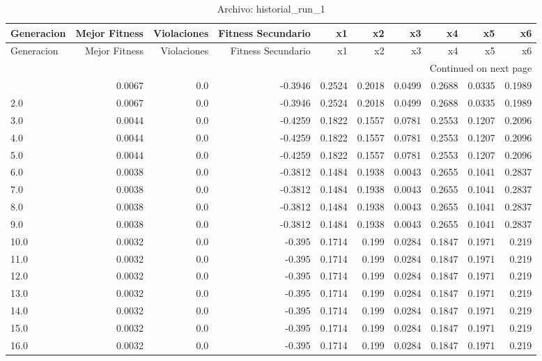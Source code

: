 \begin{longtable}{lrrrrrrrrr}
\caption{Archivo: historial\_run\_1}\label{tab:historial_run_1} \\
\toprule
Generacion & Mejor Fitness & Violaciones & Fitness Secundario & x1 & x2 & x3 & x4 & x5 & x6 \\
\midrule
\endfirsthead
\toprule
Generacion & Mejor Fitness & Violaciones & Fitness Secundario & x1 & x2 & x3 & x4 & x5 & x6 \\
\midrule
\endhead
\midrule
\multicolumn{10}{r}{Continued on next page} \\
\midrule
\endfoot
\bottomrule
\endlastfoot
1.0 & 0.0067 & 0.0 & -0.3946 & 0.2524 & 0.2018 & 0.0499 & 0.2688 & 0.0335 & 0.1989 \\
2.0 & 0.0067 & 0.0 & -0.3946 & 0.2524 & 0.2018 & 0.0499 & 0.2688 & 0.0335 & 0.1989 \\
3.0 & 0.0044 & 0.0 & -0.4259 & 0.1822 & 0.1557 & 0.0781 & 0.2553 & 0.1207 & 0.2096 \\
4.0 & 0.0044 & 0.0 & -0.4259 & 0.1822 & 0.1557 & 0.0781 & 0.2553 & 0.1207 & 0.2096 \\
5.0 & 0.0044 & 0.0 & -0.4259 & 0.1822 & 0.1557 & 0.0781 & 0.2553 & 0.1207 & 0.2096 \\
6.0 & 0.0038 & 0.0 & -0.3812 & 0.1484 & 0.1938 & 0.0043 & 0.2655 & 0.1041 & 0.2837 \\
7.0 & 0.0038 & 0.0 & -0.3812 & 0.1484 & 0.1938 & 0.0043 & 0.2655 & 0.1041 & 0.2837 \\
8.0 & 0.0038 & 0.0 & -0.3812 & 0.1484 & 0.1938 & 0.0043 & 0.2655 & 0.1041 & 0.2837 \\
9.0 & 0.0038 & 0.0 & -0.3812 & 0.1484 & 0.1938 & 0.0043 & 0.2655 & 0.1041 & 0.2837 \\
10.0 & 0.0032 & 0.0 & -0.395 & 0.1714 & 0.199 & 0.0284 & 0.1847 & 0.1971 & 0.219 \\
11.0 & 0.0032 & 0.0 & -0.395 & 0.1714 & 0.199 & 0.0284 & 0.1847 & 0.1971 & 0.219 \\
12.0 & 0.0032 & 0.0 & -0.395 & 0.1714 & 0.199 & 0.0284 & 0.1847 & 0.1971 & 0.219 \\
13.0 & 0.0032 & 0.0 & -0.395 & 0.1714 & 0.199 & 0.0284 & 0.1847 & 0.1971 & 0.219 \\
14.0 & 0.0032 & 0.0 & -0.395 & 0.1714 & 0.199 & 0.0284 & 0.1847 & 0.1971 & 0.219 \\
15.0 & 0.0032 & 0.0 & -0.395 & 0.1714 & 0.199 & 0.0284 & 0.1847 & 0.1971 & 0.219 \\
16.0 & 0.0032 & 0.0 & -0.395 & 0.1714 & 0.199 & 0.0284 & 0.1847 & 0.1971 & 0.219 \\

\end{longtable}
